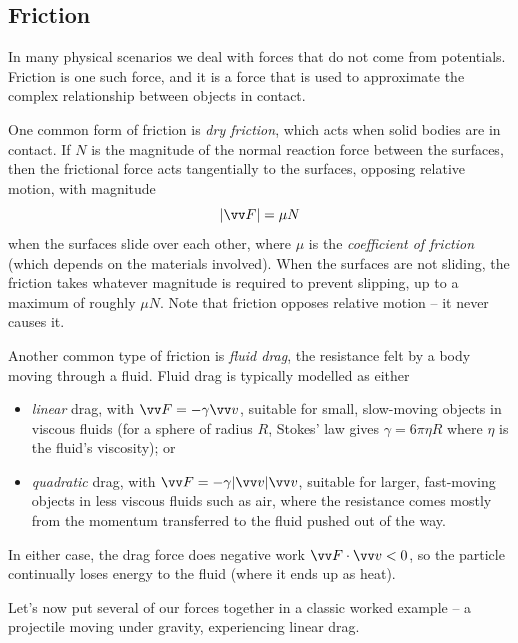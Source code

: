 \subsection{Friction}

In many physical scenarios we deal with forces that do not come from potentials. Friction is one such force, and it is a force that is used to approximate the complex relationship between objects in contact.

One common form of friction is \emph{dry friction}, which acts when solid bodies are in contact. If $N$ is the magnitude of the normal reaction force between the surfaces, then the frictional force acts tangentially to the surfaces, opposing relative motion, with magnitude
$$
|\vv F| = \mu N
$$
when the surfaces slide over each other, where $\mu$ is the \emph{coefficient of friction} (which depends on the materials involved). When the surfaces are not sliding, the friction takes whatever magnitude is required to prevent slipping, up to a maximum of roughly $\mu N$. Note that friction opposes relative motion -- it never causes it.

Another common type of friction is \emph{fluid drag}, the resistance felt by a body moving through a fluid. Fluid drag is typically modelled as either
\begin{itemize}
	\item \emph{linear} drag, with $\vv F = - \gamma \vv v$, suitable for small, slow-moving objects in viscous fluids (for a sphere of radius $R$, Stokes' law gives $\gamma = 6\pi \eta R$ where $\eta$ is the fluid's viscosity); or
	\item \emph{quadratic} drag, with $\vv F = - \gamma |\vv v| \vv v$, suitable for larger, fast-moving objects in less viscous fluids such as air, where the resistance comes mostly from the momentum transferred to the fluid pushed out of the way.
\end{itemize}
In either case, the drag force does negative work $\vv F \cdot \vv v < 0$, so the particle continually loses energy to the fluid (where it ends up as heat).

Let's now put several of our forces together in a classic worked example -- a projectile moving under gravity, experiencing linear drag.

